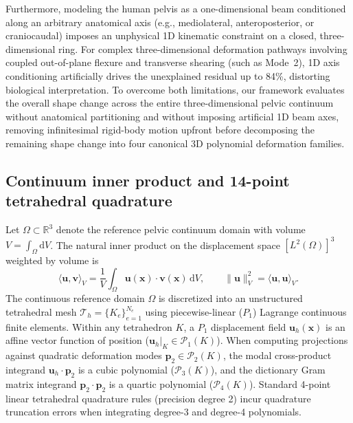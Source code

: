 \documentclass[11pt]{article}
\begin{document}
Furthermore, modeling the human pelvis as a one-dimensional beam conditioned along an arbitrary anatomical axis (e.g., mediolateral, anteroposterior, or craniocaudal) imposes an unphysical 1D kinematic constraint on a closed, three-dimensional ring.
For complex three-dimensional deformation pathways involving coupled out-of-plane flexure and transverse shearing (such as Mode~2), 1D axis conditioning artificially drives the unexplained residual up to 84\%, distorting biological interpretation.
To overcome both limitations, our framework evaluates the overall shape change across the entire three-dimensional pelvic continuum without anatomical partitioning and without imposing artificial 1D beam axes, removing infinitesimal rigid-body motion upfront before decomposing the remaining shape change into four canonical 3D polynomial deformation families.

\subsection{Continuum inner product and 14-point tetrahedral quadrature}
Let $\Omega \subset \mathbb{R}^3$ denote the reference pelvic continuum domain with volume $V = \int_\Omega \mathrm{d}V$.
The natural inner product on the displacement space $[L^2(\Omega)]^3$ weighted by volume is
\begin{equation}
\langle \mathbf u, \mathbf v \rangle_V = \frac{1}{V} \int_\Omega \mathbf u(\mathbf x) \cdot \mathbf v(\mathbf x) \, \mathrm{d}V, \qquad
\|\mathbf u\|_V^2 = \langle \mathbf u, \mathbf u \rangle_V.
\label{eq:volume-inner-product}
\end{equation}
The continuous reference domain $\Omega$ is discretized into an unstructured tetrahedral mesh $\mathcal{T}_h = \{K_e\}_{e=1}^{N_e}$ using piecewise-linear ($P_1$) Lagrange continuous finite elements.
Within any tetrahedron $K$, a $P_1$ displacement field $\mathbf u_h(\mathbf x)$ is an affine vector function of position ($\mathbf u_h|_K \in \mathcal{P}_1(K)$).
When computing projections against quadratic deformation modes $\mathbf p_2 \in \mathcal{P}_2(K)$, the modal cross-product integrand $\mathbf u_h \cdot \mathbf p_2$ is a cubic polynomial ($\mathcal{P}_3(K)$), and the dictionary Gram matrix integrand $\mathbf p_2 \cdot \mathbf p_2$ is a quartic polynomial ($\mathcal{P}_4(K)$).
Standard 4-point linear tetrahedral quadrature rules (precision degree 2) incur quadrature truncation errors when integrating degree-3 and degree-4 polynomials.
\end{document}
